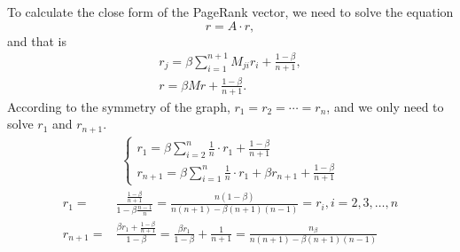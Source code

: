 \documentclass{article}
\begin{document}
To calculate the close form of the PageRank vector, we need to solve the equation
\begin{equation}
	r = A\cdot r,
\end{equation}
and that is
\begin{align}
	r_j = \beta\sum_{i=1}^{n+1}M_{ji}r_i + \frac{1-\beta}{n+1}, \\
	r = \beta Mr + \frac{1-\beta}{n+1}.
\end{align}
According to the symmetry of the graph, $r_1 = r_2 = \cdots = r_n$, and we only need to solve $r_1$ and $r_{n+1}$.
\begin{align}
	\begin{cases}
		r_1 = \beta \sum_{i=2}^{n}\frac{1}{n}\cdot r_1  + \frac{1-\beta}{n+1} \\
		r_{n+1} = \beta \sum_{i=1}^{n}\frac{1}{n}\cdot r_1 + \beta r_{n+1} + \frac{1-\beta}{n+1}
	\end{cases}
\end{align}
\begin{align}
	r_1 =     & \frac{\frac{1-\beta}{n+1}}{1-\beta\frac{n-1}{n}} = \frac{n(1-\beta)}{n(n+1) - \beta (n+1)(n-1)} = r_i, i=2, 3, \dots, n               \\
	r_{n+1} = & \frac{\beta r_1+\frac{1-\beta}{n+1}}{1-\beta} = \frac{\beta r_1}{1-\beta} + \frac{1}{n+1} = \frac{n_\beta}{n(n+1) - \beta (n+1)(n-1)}
\end{align}
\end{document}
